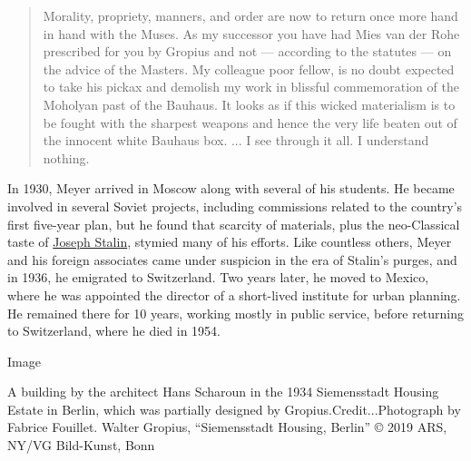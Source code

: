 \begin{quote}
Morality, propriety, manners, and order are now to return once more hand
in hand with the Muses. As my successor you have had Mies van der Rohe
prescribed for you by Gropius and not --- according to the statutes ---
on the advice of the Masters. My colleague poor fellow, is no doubt
expected to take his pickax and demolish my work in blissful
commemoration of the Moholyan past of the Bauhaus. It looks as if this
wicked materialism is to be fought with the sharpest weapons and hence
the very life beaten out of the innocent white Bauhaus box. ... I see
through it all. I understand nothing.
\end{quote}

In 1930, Meyer arrived in Moscow along with several of his students. He
became involved in several Soviet projects, including commissions
related to the country's first five-year plan, but he found that
scarcity of materials, plus the neo-Classical taste of
\href{https://www.nytimes3xbfgragh.onion/topic/person/joseph-stalin}{Joseph
Stalin}, stymied many of his efforts. Like countless others, Meyer and
his foreign associates came under suspicion in the era of Stalin's
purges, and in 1936, he emigrated to Switzerland. Two years later, he
moved to Mexico, where he was appointed the director of a short-lived
institute for urban planning. He remained there for 10 years, working
mostly in public service, before returning to Switzerland, where he died
in 1954.

Image

A building by the architect Hans Scharoun in the 1934 Siemensstadt
Housing Estate in Berlin, which was partially designed by
Gropius.Credit...Photograph by Fabrice Fouillet. Walter Gropius,
``Siemensstadt Housing, Berlin'' © 2019 ARS, NY/VG Bild-Kunst, Bonn

